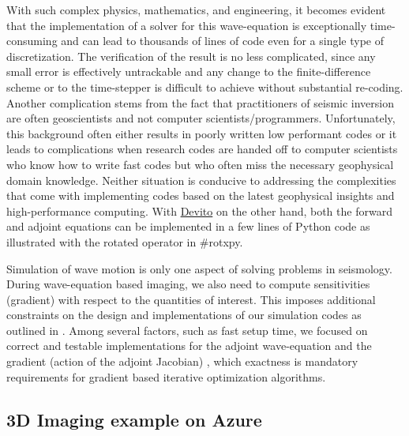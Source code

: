 \documentclass[conference]{IEEEtran}
\begin{document}
With such complex physics, mathematics, and engineering, it becomes
evident that the implementation of a solver for this wave-equation is
exceptionally time-consuming and can lead to thousands of lines of code
even for a single type of discretization. The verification of the result
is no less complicated, since any small error is effectively untrackable
and any change to the finite-difference scheme or to the time-stepper is
difficult to achieve without substantial re-coding. Another complication
stems from the fact that practitioners of seismic inversion are often
geoscientists and not computer scientists/programmers. Unfortunately,
this background often either results in poorly written low performant
codes or it leads to complications when research codes are handed off to
computer scientists who know how to write fast codes but who often miss
the necessary geophysical domain knowledge. Neither situation is
conducive to addressing the complexities that come with implementing
codes based on the latest geophysical insights and high-performance
computing. With \href{https://github.com/devitocodes/devito}{Devito} on
the other hand, both the forward and adjoint equations can be
implemented in a few lines of Python code as illustrated with the
rotated operator in \#rotxpy.

Simulation of wave motion is only one aspect of solving problems in
seismology. During wave-equation based imaging, we also need to compute
sensitivities (gradient) with respect to the quantities of interest.
This imposes additional constraints on the design and implementations of
our simulation codes as outlined in \cite{virieux}. Among several
factors, such as fast setup time, we focused on correct and testable
implementations for the adjoint wave-equation and the gradient (action
of the adjoint Jacobian)
\cite{louboutin2018segeow, louboutin2020THmfi}, which exactness is
mandatory requirements for gradient based iterative optimization
algorithms.

\subsection{3D Imaging example on Azure}\label{d-imaging-example-on-azure}
\end{document}
